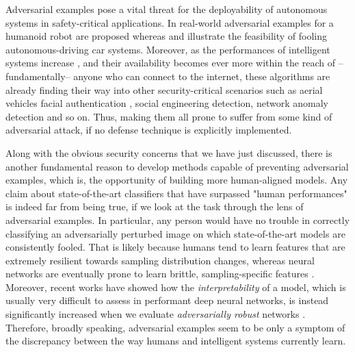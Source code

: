 \documentclass[LaM,binding=0.6cm]{./packages/sapthesis/sapthesis}
\begin{document}
        Adversarial examples pose a vital threat for the deployability of autonomous systems in safety-critical applications. In \cite{iCub} real-world adversarial examples for 
        a humanoid robot are proposed whereas \cite{darts} and \cite{autonomous_adv} illustrate the feasibility of fooling autonomous-driving car systems.
        Moreover, as the performances of intelligent systems increase \cite{residual_nets} \cite{inception}, and their availability becomes ever more within the reach of --fundamentally-- anyone who can connect to the internet, these algorithms 
        are already finding their way into other security-critical scenarios such as aerial vehicles facial authentication \cite{aerialveichles}, social engineering detection, network anomaly detection \cite{socialeng_adv} \cite{anomalydet_adv} and so on. 
        Thus, making them all prone to suffer from some kind of adversarial attack, if no defense technique is explicitly implemented.
        
        Along with the obvious security concerns that we have just discussed, there is another fundamental reason to develop methods capable of preventing adversarial examples, which is, the opportunity of 
        building more human-aligned models. Any claim about state-of-the-art classifiers that have surpassed "human performances" is indeed far from being true, if we look at the task through the lens of adversarial examples.
        In particular, any person would have no trouble in correctly classifying an adversarially perturbed image on which state-of-the-art models are consistently fooled. That is likely because humans tend to learn features that are 
        extremely resilient towards sampling distribution changes, whereas neural networks are eventually prone to learn brittle, sampling-specific features \cite{features_notbugs}.
        Moreover, recent works have showed how the \textit{interpretability} of a model, which is usually very difficult to assess in performant deep neural networks, is instead significantly increased 
        when we evaluate \textit{adversarially robust} networks \cite{robustness_accuracy} \cite{interpret_adv}. Therefore, broadly speaking, adversarial examples 
        seem to be only a symptom of the discrepancy between the way humans and intelligent systems currently learn. 
        
\end{document}

